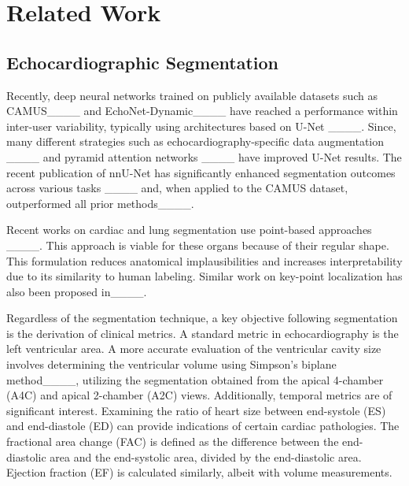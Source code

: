 \section{Related Work}
\label{sec:related_work}

\subsection{Echocardiographic Segmentation}

Recently, deep neural networks trained on publicly available datasets such as CAMUS____ and EchoNet-Dynamic____ have reached a performance within inter-user variability, typically using architectures based on U-Net ____. Since, many different strategies such as echocardiography-specific data augmentation ____ and pyramid attention networks ____ have improved U-Net results. 
The recent publication of nnU-Net has significantly enhanced segmentation outcomes across various tasks ____ and, when applied to the CAMUS dataset, outperformed all prior methods____.%


Recent works on cardiac and lung segmentation use point-based approaches ____. This approach is viable for these organs because of their regular shape. This formulation reduces anatomical implausibilities and increases interpretability due to its similarity to human labeling. Similar work on key-point localization has also been proposed in____. 


Regardless of the segmentation technique, a key objective following segmentation is the derivation of clinical metrics. A standard metric in echocardiography is the left ventricular area. A more accurate evaluation of the ventricular cavity size involves determining the ventricular volume using Simpson's biplane method____, utilizing the segmentation obtained from the apical 4-chamber (A4C) and apical 2-chamber (A2C) views. Additionally, temporal metrics are of significant interest. Examining the ratio of heart size between end-systole (ES) and end-diastole (ED) can provide indications of certain cardiac pathologies. The fractional area change (FAC) is defined as the difference between the end-diastolic  area and the end-systolic  area, divided by the end-diastolic area. Ejection fraction (EF) is calculated similarly, albeit with volume measurements.



